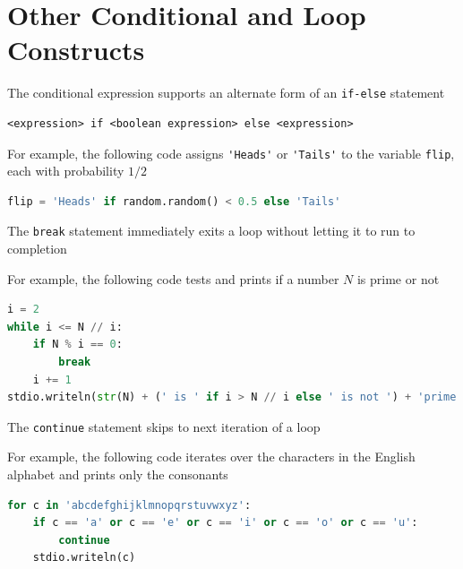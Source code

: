 \documentclass[8pt,a4paper,compress]{beamer}
\begin{document}
\section{Other Conditional and Loop Constructs}
\begin{frame}[fragile]
\pause

The conditional expression supports an alternate form of an \lstinline$if-else$ statement
 
\smallskip

\begin{lstlisting}[language={},style=focusin]
<expression> if <boolean expression> else <expression>
\end{lstlisting}

\pause\bigskip

For example, the following code assigns \lstinline{'Heads'} or \lstinline{'Tails'} to the variable \lstinline{flip}, each with probability $1/2$

\smallskip

\begin{lstlisting}[language=Python,style=focusin]
flip = 'Heads' if random.random() < 0.5 else 'Tails'
\end{lstlisting}

\pause\bigskip

The \lstinline{break} statement immediately exits a loop without letting it to run to completion

\pause\bigskip

For example, the following code tests and prints if a number $N$ is prime or not

\smallskip

\begin{lstlisting}[language=Python,style=focusin]
i = 2
while i <= N // i:
    if N % i == 0:
        break
    i += 1
stdio.writeln(str(N) + (' is ' if i > N // i else ' is not ') + 'prime')
\end{lstlisting}

\pause\bigskip

The \lstinline{continue} statement skips to next iteration of a loop

\pause\bigskip

For example, the following code iterates over the characters in the English alphabet and prints only the consonants

\smallskip

\begin{lstlisting}[language=Python,style=focusin]
for c in 'abcdefghijklmnopqrstuvwxyz':
    if c == 'a' or c == 'e' or c == 'i' or c == 'o' or c == 'u':
        continue
    stdio.writeln(c)
\end{lstlisting}
\end{frame}
\end{document}
